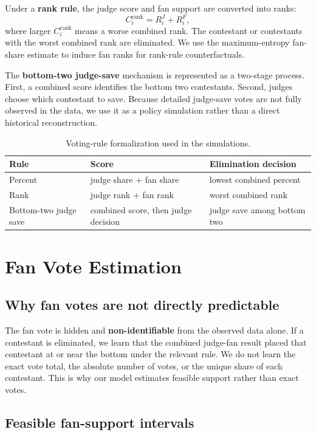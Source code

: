 \documentclass[12pt]{article}
\begin{document}
Under a \textbf{rank rule}, the judge score and fan support are converted into ranks:
\[
  C^{\mathrm{rank}}_i = R^J_i + R^F_i,
\]
where larger $C^{\mathrm{rank}}_i$ means a worse combined rank. The contestant
or contestants with the worst combined rank are eliminated. We use the
maximum-entropy fan-share estimate to induce fan ranks for rank-rule
counterfactuals.

The \textbf{bottom-two judge-save} mechanism is represented as a two-stage process.
First, a combined score identifies the bottom two contestants. Second, judges
choose which contestant to save. Because detailed judge-save votes are not
fully observed in the data, we use it as a policy simulation rather than a
direct historical reconstruction.

\begin{table}[!htbp]
  \centering
  \caption{Voting-rule formalization used in the simulations.}
  \label{tab:voting-rules}
  \begin{tabular}{lll}
    \toprule
    Rule & Score & Elimination decision \\
    \midrule
    Percent & judge share + fan share & lowest combined percent \\
    Rank & judge rank + fan rank & worst combined rank \\
    Bottom-two judge save & combined score, then judge decision & judge save among bottom two \\
    \bottomrule
  \end{tabular}
\end{table}

\section{Fan Vote Estimation}

\subsection{Why fan votes are not directly predictable}

The fan vote is hidden and \textbf{non-identifiable} from the observed data alone. If a
contestant is eliminated, we learn that the combined judge-fan result placed
that contestant at or near the bottom under the relevant rule. We do not learn
the exact vote total, the absolute number of votes, or the unique share of each
contestant. This is why our model estimates feasible support rather than exact
votes.

\subsection{Feasible fan-support intervals}
\end{document}
